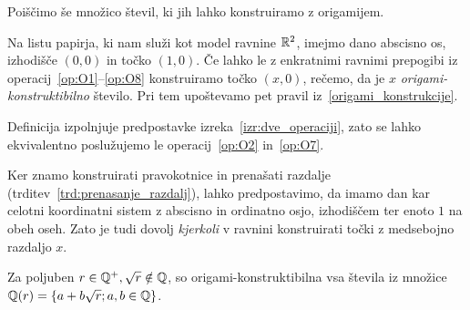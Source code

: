 Poiščimo še množico števil, ki jih lahko konstruiramo z origamijem.

\begin{definicija}
    Na listu papirja, ki nam služi kot model ravnine $\mathbb R^2$, imejmo dano abscisno os, izhodišče $(0,0)$ in točko $(1,0)$. Če lahko le z enkratnimi ravnimi prepogibi iz operacij~\ref{op:O1}--\ref{op:O8} konstruiramo točko $(x,0)$, rečemo, da je $x$ \emph{origami-konstruktibilno} število. Pri tem upoštevamo pet pravil iz~\ref{origami_konstrukcije}.
\end{definicija}

\begin{opomba}
    Definicija izpolnjuje predpostavke izreka~\ref{izr:dve_operaciji}, zato se lahko ekvivalentno poslužujemo le operacij~\ref{op:O2} in~\ref{op:O7}.
\end{opomba}

\begin{opomba}
    Ker znamo konstruirati pravokotnice in prenašati razdalje (trditev~\ref{trd:prenasanje_razdalj}), lahko predpostavimo, da imamo dan kar celotni koordinatni sistem z abscisno in ordinatno osjo, izhodiščem ter enoto $1$ na obeh oseh. Zato je tudi dovolj \emph{kjerkoli} v ravnini konstruirati točki z medsebojno razdaljo $x$.
\end{opomba}

\begin{izrek}
    \label{izr:origami_konstruktibilnost}
    Za poljuben $r \in \mathbb Q^{+}, \sqrt{r} \notin \mathbb Q$, so origami-konstruktibilna vsa števila iz množice $\mathbb Q(r) = \{a + b\sqrt{r}; a, b \in \mathbb Q\}$.
\end{izrek}

